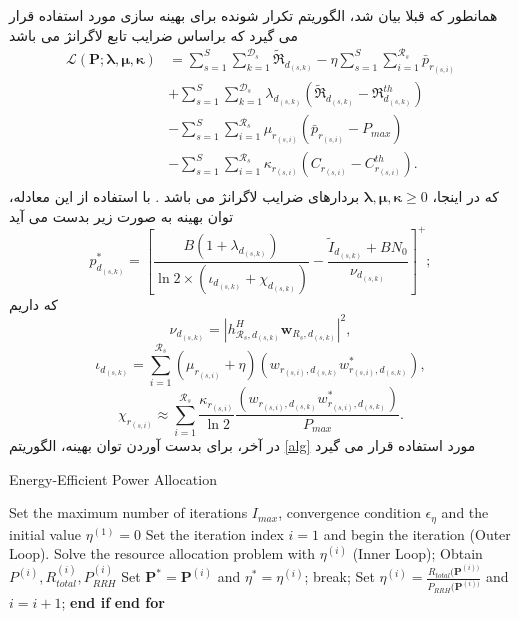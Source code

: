 همانطور که قبلا بیان شد، الگوریتم تکرار شونده برای بهینه سازی مورد استفاده قرار می گیرد که براساس ضرایب تابع لاگرانژ می باشد 
\begin{equation}
\begin{split}
\mathcal{L}(\boldsymbol{P}; \boldsymbol{\lambda}, \boldsymbol{\mu}, \boldsymbol{ \kappa}) & = \sum\limits_{s=1}^{S} \sum\limits_{k=1}^{\mathcal{D}_s}\mathfrak{\tilde{R}}_{d_{(s,k)}} 
- \eta \sum\limits_{s=1}^{S} \sum\limits_{i=1}^{\mathcal{R}_s}\bar{p}_{r_{(s,i)}}\\
&+\sum\limits_{s=1}^{S} \sum\limits_{k=1}^{\mathcal{D}_s} \lambda_{d_{(s,k)}} (\mathfrak{\tilde{R}}_{d_{(s,k)}}-\mathfrak{R}_{d_{(s,k)}}^{th})\\
&- \sum\limits_{s=1}^{S} \sum\limits_{i=1}^{\mathcal{R}_s} \mu_{r_{(s,i)}} (\bar{p}_{r_{(s,i)}}-P_{max})\\
&- \sum\limits_{s=1}^{S} \sum\limits_{i=1}^{\mathcal{R}_s} \kappa_{r_{(s,i)}} (C_{r_{(s,i)}}-C_{r_{(s,i)}}^{th}).\\
\end{split}
\end{equation}
که در اینجا، $\boldsymbol{\lambda}, \boldsymbol{\mu}, \boldsymbol{\kappa} \geq 0$
بردارهای ضرایب لاگرانژ می باشد .\newline
با استفاده از این معادله، توان بهینه به صورت زیر بدست می آید
\begin{equation}
p_{d_{(s,k)}}^* =[\frac{ B(1+\lambda_{d_{(s,k)}} )}{\ln2 \times (\iota_{d_{(s,k)}}+ \chi_{d_{(s,k)}})} -\frac{\tilde{I}_{d_{(s,k)}} + BN_0}{\nu_{d_{(s,k)}} }]^+;
\end{equation} 
که داریم
 $$\nu_{d_{(s,k)}} =|h_{\mathcal{R}_s, d_{(s,k)}}^H \boldsymbol{w}_{R_{s},d_{(s,k)}}|^2,$$
 $$\iota_{d_{(s,k)}}= \sum\limits_{i=1}^{\mathcal{R}_s} (\mu_{r_{(s,i)}}+\eta)(w_{r_{(s,i)},d_{(s,k)}} w_{r_{(s,i)},d_{(s,k)}}^*),$$
 $$\chi_{r_{(s,i)}} \approx  \sum\limits_{i=1}^{\mathcal{R}_s} \frac{\kappa_{r_{(s,i)}}}{\ln 2}\frac{(w_{r_{(s,i)},d_{(s,k)}} w_{r_{(s,i)},d_{(s,k)}}^*)}{ P_{max}}.$$
  در آخر، برای بدست آوردن توان بهینه، الگوریتم \eqref{alg} مورد استفاده قرار می گیرد \cite{hcranEE}
 \begin{latin}
\begin{algorithm}
\caption{Energy-Efficient Power Allocation}\label{alg}
\begin{algorithmic}

\State Set the maximum number of iterations $I_{max}$, convergence condition $\epsilon_{\eta}$  and the initial value $\eta^{(1)} = 0$
\State Set the iteration index $i = 1$ and begin the iteration (Outer
Loop).
\State Solve the resource allocation problem with $\eta^{(i)}$ (Inner Loop);
\State Obtain $P^{(i)}, R_{total}^{(i)}, P_{RRH}^{(i)}$
\State Set $\boldsymbol{P}^*= \boldsymbol{P}^{(i)} $   and  $ \eta^{*} =\eta^{(i)} $;
\State break;
\Else
\State Set $\eta^{(i)}= \frac{R_{total}(\boldsymbol{P}^{(i))}}{P_{RRH}(\boldsymbol{P}^{(i))}}$ and $i= i+1$;
\EndIf 
\State \textbf{end if}
\EndFor 
\State \textbf{end for}

\end{algorithmic}
\end{algorithm}
\end{latin}
